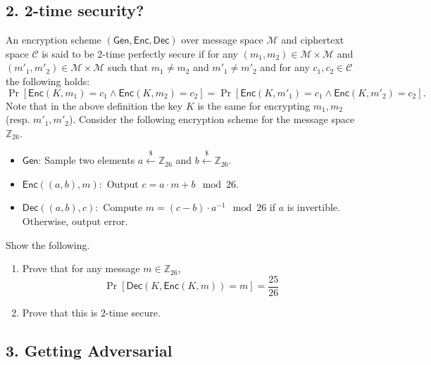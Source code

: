 \documentclass[11pt]{article}
\newcommand{\Gen}{\mathsf{Gen}}
\newcommand{\Enc}{\mathsf{Enc}}
\newcommand{\Dec}{\mathsf{Dec}}
\newcommand{\Z}{\mathbb{Z}}
\newcommand{\getsr}{\stackrel{\$}{\gets}}
\begin{document}
\subsection*{2. 2-time security?}
An encryption scheme $(\Gen,\Enc,\Dec)$ over message space $\mathcal{M}$ and ciphertext space $\mathcal{C}$ is said to be 2-time perfectly secure if for any $(m_1,m_2) \in \mathcal{M} \times \mathcal{M}$ and $(m'_1,m'_2) \in \mathcal{M} \times \mathcal{M}$ such that $m_1 \neq m_2$ and $m'_1 \neq m'_2$ and for any $c_1,c_2 \in \mathcal{C}$ the following holds:
$$
\Pr[\Enc(K,m_1) = c_1 \wedge \Enc(K,m_2) = c_2] = \Pr[\Enc(K,m'_1) = c_1 \wedge \Enc(K,m'_2) = c_2].
$$
Note that in the above definition the key $K$ is the same for encrypting $m_1,m_2$ (resp. $m'_1,m'_2$).
Consider the following encryption scheme for the message space $\Z_{26}$.
\begin{itemize}
    \item $\Gen$: Sample two elements $a \getsr \Z_{26} $ and $b \getsr \Z_{26}$.
    \item $\Enc((a,b),m):$ Output $c = a\cdot m + b \mod 26$.
    \item $\Dec((a,b),c):$ Compute $m = (c - b) \cdot a^{-1} \mod 26$ if $a$ is invertible. Otherwise, output error.
\end{itemize}
Show the following.
\begin{enumerate}
    \item Prove that for any message $m \in \Z_{26}$, 
    $$
    \Pr[\Dec(K,\Enc(K,m)) = m] = \frac{25}{26}
    $$
    \item Prove that this is $2$-time secure.
\end{enumerate}

\subsection*{3. Getting Adversarial}
\end{document}
